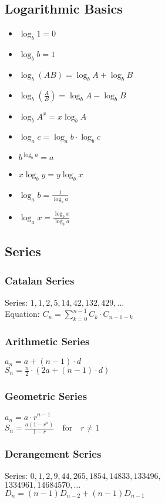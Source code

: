 \documentclass[10pt, a4paper,twocolumn]{article}
\begin{document}
\subsection{Logarithmic Basics}
\begin{itemize}
    \item \(\log_b 1 = 0\)
    \item \(\log_b b = 1\)
    \item \(\log_b (AB) = \log_b A + \log_b B\)
    \item \(\log_b \left(\frac{A}{B}\right) = \log_b A - \log_b B\)
    \item \(\log_b A^x = x \log_b A\)
    \item \(\log_a c = \log_a b \cdot \log_b c\)
    \item \(b^{\log_b a} = a\)
    \item \(x \log_b y = y \log_b x\)
    \item \(\log_a b = \frac{1}{\log_b a}\)
    \item \(\log_a x = \frac{\log_b x}{\log_b a}\)
\end{itemize}

\subsection{Series}

\subsubsection{Catalan Series} 
Series: \(1, 1, 2, 5, 14, 42, 132, 429, \dots\) \\
Equation: \(C_n = \sum_{k=0}^{n-1} C_k \cdot C_{n-1-k}\)

\subsubsection{Arithmetic Series} 
\(a_n = a + (n - 1) \cdot d\) \\
\(S_n = \frac{n}{2} \cdot (2a + (n - 1) \cdot d)\)

\subsubsection{Geometric Series} 
\(a_n = a \cdot r^{n-1}\) \\
\(S_n = \frac{a(1 - r^n)}{1 - r} \quad \text{for} \quad r \neq 1\)

\subsubsection{Derangement Series} 
Series: \(0, 1, 2, 9, 44, 265, 1854, 14833, 133496,\) \\
\(1334961, 14684570, \dots\) \\
\(D_n = (n - 1)D_{n - 2} + (n - 1)D_{n - 1}\)
\end{document}
